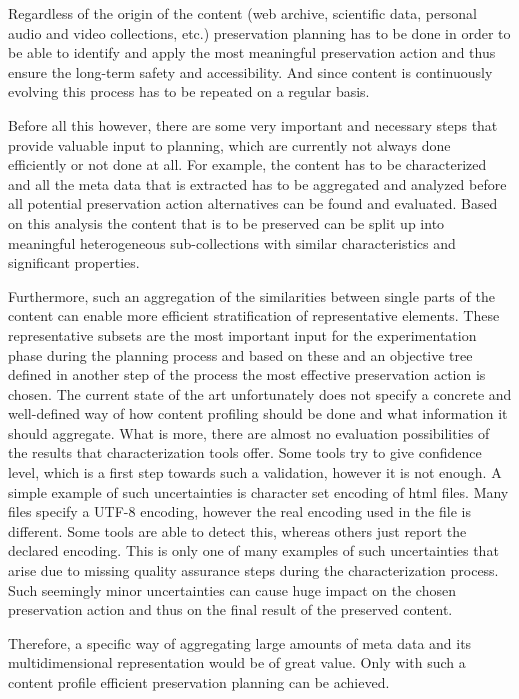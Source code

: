 Regardless of the origin of the content (web archive, scientific data, personal audio and video collections, etc.) preservation planning has to be done in order to be able to identify and apply the most meaningful preservation action and thus ensure the long-term safety and accessibility. And since content is continuously evolving this process has to be repeated on a regular basis.

Before all this however, there are some very important and necessary steps that provide valuable input to planning, which are currently not always done efficiently or not done at all.
For example, the content has to be characterized and all the meta data that is extracted has to be aggregated and analyzed before all potential preservation action alternatives can be found and evaluated. Based on this analysis the content that is to be preserved can be split up into meaningful heterogeneous sub-collections with similar characteristics and significant properties.
 
Furthermore, such an aggregation of the similarities between single parts of the content can enable more efficient stratification of representative elements. These representative subsets 
are the most important input for the experimentation phase during the planning process and based on these and an objective tree defined in another step of the process the most effective preservation action is chosen.
The current state of the art unfortunately does not specify a concrete and well-defined way of how content profiling should be done and what information it should aggregate. What is more, there are almost no evaluation possibilities of the results that characterization tools offer. Some tools try to give confidence level, which is a first step towards such a validation, however it is not enough. A simple example of such uncertainties is character set encoding of html files. Many files specify a UTF-8 encoding, however the real encoding used in the file is different. Some tools are able to detect this, whereas others just report the declared encoding. This is only one of many examples of such uncertainties that arise due to missing quality assurance steps during the characterization process. Such seemingly minor uncertainties can cause huge impact on the chosen preservation action and thus on the final result of the preserved content.

Therefore, a specific way of aggregating large amounts of meta data and its multidimensional representation would be of great value. Only with such a content profile efficient preservation planning can be achieved.

